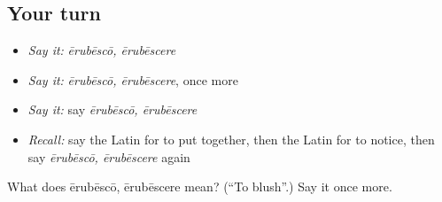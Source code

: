 \subsection*{Your turn}
\begin{itemize}
\raggedright
  \item \emph{Say it:} \emph{ērubēscō, ērubēscere}
  \item \emph{Say it:} \emph{ērubēscō, ērubēscere}, once more
  \item \emph{Say it:} say \emph{ērubēscō, ērubēscere}
  \item \emph{Recall:} say the Latin for to put together, then the Latin for to notice, then say \emph{ērubēscō, ērubēscere} again
\end{itemize}

\begin{tcolorbox}[breakable,colback=teal!4,colframe=teal!35!black,title={Before you move on}]
What does ērubēscō, ērubēscere mean? (\textquotedblleft{}To blush\textquotedblright{}.) Say it once more.
\end{tcolorbox}
